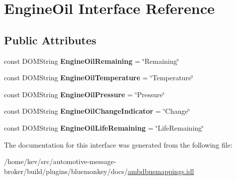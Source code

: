 \hypertarget{interfaceEngineOil}{\section{Engine\+Oil Interface Reference}
\label{interfaceEngineOil}
}
\subsection*{Public Attributes}
\begin{DoxyCompactItemize}
\item 
\hypertarget{interfaceEngineOil_a28a148b5fcbf4d61ab438f229870e997}{const D\+O\+M\+String {\bfseries Engine\+Oil\+Remaining} = \char`\"{}Remaining\char`\"{}}\label{interfaceEngineOil_a28a148b5fcbf4d61ab438f229870e997}

\item 
\hypertarget{interfaceEngineOil_a5b260a98314b5f69eae0411db6318a3f}{const D\+O\+M\+String {\bfseries Engine\+Oil\+Temperature} = \char`\"{}Temperature\char`\"{}}\label{interfaceEngineOil_a5b260a98314b5f69eae0411db6318a3f}

\item 
\hypertarget{interfaceEngineOil_a380dd755fe98983b8128bac94b64b9b5}{const D\+O\+M\+String {\bfseries Engine\+Oil\+Pressure} = \char`\"{}Pressure\char`\"{}}\label{interfaceEngineOil_a380dd755fe98983b8128bac94b64b9b5}

\item 
\hypertarget{interfaceEngineOil_a03d33d32192b81088d1ed52d2f959262}{const D\+O\+M\+String {\bfseries Engine\+Oil\+Change\+Indicator} = \char`\"{}Change\char`\"{}}\label{interfaceEngineOil_a03d33d32192b81088d1ed52d2f959262}

\item 
\hypertarget{interfaceEngineOil_aaf63ba970af16d0c7d914b3c5dcdddc2}{const D\+O\+M\+String {\bfseries Engine\+Oil\+Life\+Remaining} = \char`\"{}Life\+Remaining\char`\"{}}\label{interfaceEngineOil_aaf63ba970af16d0c7d914b3c5dcdddc2}

\end{DoxyCompactItemize}


The documentation for this interface was generated from the following file\+:\begin{DoxyCompactItemize}
\item 
/home/kev/src/automotive-\/message-\/broker/build/plugins/bluemonkey/docs/\hyperlink{ambdbusmappings_8idl}{ambdbusmappings.\+idl}\end{DoxyCompactItemize}
